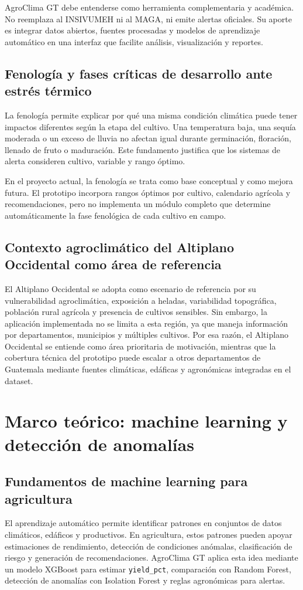 \documentclass[12pt,letterpaper,oneside]{report}
\newcommand{\codigo}[1]{\texttt{#1}}
\begin{document}
AgroClima GT debe entenderse como herramienta complementaria y académica. No reemplaza al INSIVUMEH ni al MAGA, ni emite alertas oficiales. Su aporte es integrar datos abiertos, fuentes procesadas y modelos de aprendizaje automático en una interfaz que facilite análisis, visualización y reportes.

\section{Fenología y fases críticas de desarrollo ante estrés térmico}
La fenología permite explicar por qué una misma condición climática puede tener impactos diferentes según la etapa del cultivo. Una temperatura baja, una sequía moderada o un exceso de lluvia no afectan igual durante germinación, floración, llenado de fruto o maduración. Este fundamento justifica que los sistemas de alerta consideren cultivo, variable y rango óptimo.

En el proyecto actual, la fenología se trata como base conceptual y como mejora futura. El prototipo incorpora rangos óptimos por cultivo, calendario agrícola y recomendaciones, pero no implementa un módulo completo que determine automáticamente la fase fenológica de cada cultivo en campo.

\section{Contexto agroclimático del Altiplano Occidental como área de referencia}
El Altiplano Occidental se adopta como escenario de referencia por su vulnerabilidad agroclimática, exposición a heladas, variabilidad topográfica, población rural agrícola y presencia de cultivos sensibles. Sin embargo, la aplicación implementada no se limita a esta región, ya que maneja información por departamentos, municipios y múltiples cultivos. Por esa razón, el Altiplano Occidental se entiende como área prioritaria de motivación, mientras que la cobertura técnica del prototipo puede escalar a otros departamentos de Guatemala mediante fuentes climáticas, edáficas y agronómicas integradas en el dataset.

\chapter{Marco teórico: machine learning y detección de anomalías}

\section{Fundamentos de machine learning para agricultura}
El aprendizaje automático permite identificar patrones en conjuntos de datos climáticos, edáficos y productivos. En agricultura, estos patrones pueden apoyar estimaciones de rendimiento, detección de condiciones anómalas, clasificación de riesgo y generación de recomendaciones. AgroClima GT aplica esta idea mediante un modelo XGBoost para estimar \codigo{yield\_pct}, comparación con Random Forest, detección de anomalías con Isolation Forest y reglas agronómicas para alertas.
\end{document}
